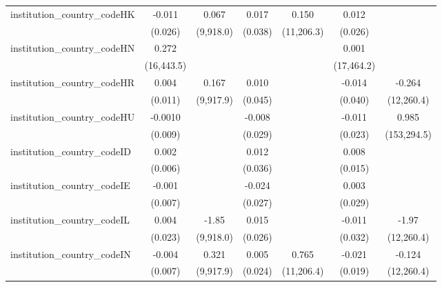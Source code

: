\begin{tabular}{lcccccc}
   institution\_country\_codeHK          & -0.011         & 0.067         & 0.017         & 0.150        & 0.012        &   \\   
                                         & (0.026)        & (9,918.0)     & (0.038)       & (11,206.3)   & (0.026)      &   \\   
   institution\_country\_codeHN          & 0.272          &               &               &              & 0.001        &   \\   
                                         & (16,443.5)     &               &               &              & (17,464.2)   &   \\   
   institution\_country\_codeHR          & 0.004          & 0.167         & 0.010         &              & -0.014       & -0.264\\   
                                         & (0.011)        & (9,917.9)     & (0.045)       &              & (0.040)      & (12,260.4)\\   
   institution\_country\_codeHU          & -0.0010        &               & -0.008        &              & -0.011       & 0.985\\   
                                         & (0.009)        &               & (0.029)       &              & (0.023)      & (153,294.5)\\   
   institution\_country\_codeID          & 0.002          &               & 0.012         &              & 0.008        &   \\   
                                         & (0.006)        &               & (0.036)       &              & (0.015)      &   \\   
   institution\_country\_codeIE          & -0.001         &               & -0.024        &              & 0.003        &   \\   
                                         & (0.007)        &               & (0.027)       &              & (0.029)      &   \\   
   institution\_country\_codeIL          & 0.004          & -1.85         & 0.015         &              & -0.011       & -1.97\\   
                                         & (0.023)        & (9,918.0)     & (0.026)       &              & (0.032)      & (12,260.4)\\   
   institution\_country\_codeIN          & -0.004         & 0.321         & 0.005         & 0.765        & -0.021       & -0.124\\   
                                         & (0.007)        & (9,917.9)     & (0.024)       & (11,206.4)   & (0.019)      & (12,260.4)\\   

\end{tabular}

